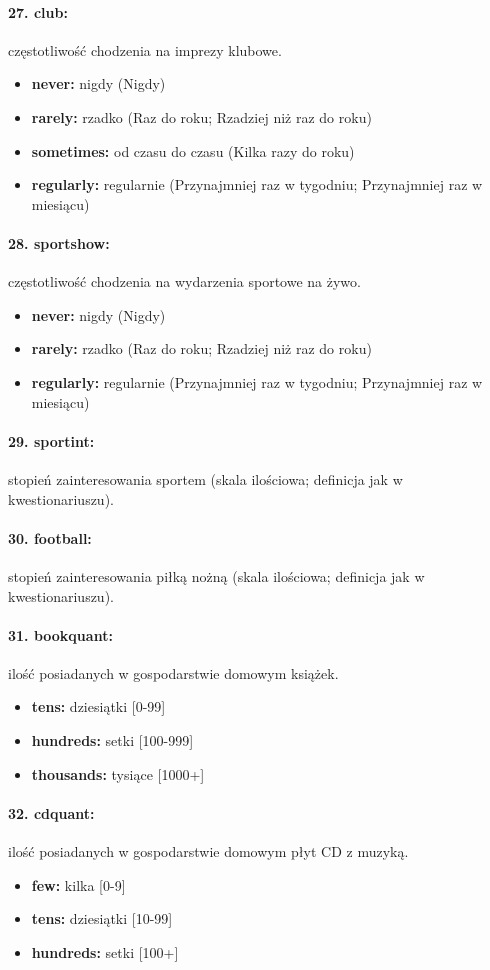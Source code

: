 \documentclass[10pt, a4paper]{article}
\begin{document}
\paragraph{27. club:} częstotliwość chodzenia na imprezy klubowe.
\begin{itemize}
	\item {\bf never:} nigdy (Nigdy)
	\item {\bf rarely:} rzadko (Raz do roku; Rzadziej niż raz do roku)
	\item {\bf sometimes:} od czasu do czasu (Kilka razy do roku)
	\item {\bf regularly:} regularnie (Przynajmniej raz w tygodniu; Przynajmniej raz w miesiącu)
\end{itemize}
\paragraph{28. sportshow:} częstotliwość chodzenia na wydarzenia sportowe na żywo.
\begin{itemize}
	\item {\bf never:} nigdy (Nigdy)
	\item {\bf rarely:} rzadko (Raz do roku; Rzadziej niż raz do roku)
	\item {\bf regularly:} regularnie (Przynajmniej raz w tygodniu; Przynajmniej raz w miesiącu)
\end{itemize}
\paragraph{29. sportint:} stopień zainteresowania sportem (skala ilościowa; definicja jak w kwestionariuszu).
\paragraph{30. football:} stopień zainteresowania piłką nożną (skala ilościowa; definicja jak w kwestionariuszu).
\paragraph{31. bookquant:} ilość posiadanych w gospodarstwie domowym książek.
\begin{itemize}
	\item {\bf tens:} dziesiątki [0-99]
	\item {\bf hundreds:} setki [100-999]
	\item {\bf thousands:} tysiące [1000+]
\end{itemize}
\paragraph{32. cdquant:} ilość posiadanych w gospodarstwie domowym płyt CD z muzyką.
\begin{itemize}
	\item {\bf few:} kilka [0-9]
	\item {\bf tens:} dziesiątki [10-99]
	\item {\bf hundreds:} setki [100+]
\end{itemize}
\end{document}
